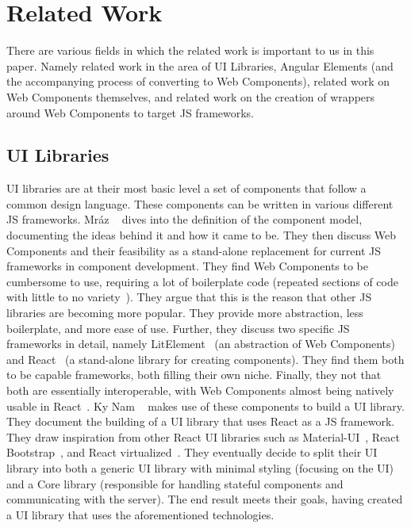\chapter{Related Work}\label{chap:related-work}

There are various fields in which the related work is important to us in this paper. Namely related work in the area of UI Libraries, Angular Elements (and the accompanying process of converting to Web Components), related work on Web Components themselves, and related work on the creation of wrappers around Web Components to target JS frameworks.

\section{UI Libraries}
UI libraries are at their most basic level a set of components that follow a common design language. These components can be written in various different JS frameworks. Mráz \etal{}~\cite{mrazcomponent} dives into the definition of the component model, documenting the ideas behind it and how it came to be. They then discuss Web Components and their feasibility as a stand-alone replacement for current JS frameworks in component development. They find Web Components to be cumbersome to use, requiring a lot of boilerplate code (repeated sections of code with little to no variety~\cite{inproceedings}). They argue that this is the reason that other JS libraries are becoming more popular. They provide more abstraction, less boilerplate, and more ease of use. Further, they discuss two specific JS frameworks in detail, namely LitElement~ (an abstraction of Web Components) and React~ (a stand-alone library for creating components). They find them both to be capable frameworks, both filling their own niche. Finally, they not that both are essentially interoperable, with Web Components almost being natively usable in React~.
Ky Nam \etal{}~\cite{ky2019ui} makes use of these components to build a UI library. They document the building of a UI library that uses React as a JS framework. They draw inspiration from other React UI libraries such as Material-UI~, React Bootstrap~, and React virtualized~. They eventually decide to split their UI library into both a generic UI library with minimal styling (focusing on the UI) and a Core library (responsible for handling stateful components and communicating with the server). The end result meets their goals, having created a UI library that uses the aforementioned technologies.
